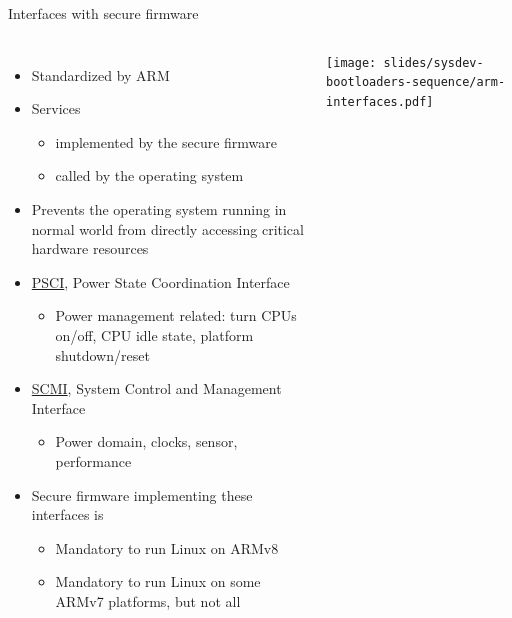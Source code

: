 \begin{frame}{Interfaces with secure firmware}
  \begin{columns}
    \begin{itemize}
    \item Standardized by ARM
    \item Services
      \begin{itemize}
      \item implemented by the secure firmware
      \item called by the operating system
      \end{itemize}
    \item Prevents the operating system running in normal world from
      directly accessing critical hardware resources
    \item
      \href{http://infocenter.arm.com/help/topic/com.arm.doc.den0022d/Power_State_Coordination_Interface_PDD_v1_1_DEN0022D.pdf}{PSCI},
      Power State Coordination Interface
      \begin{itemize}
      \item Power management related: turn CPUs on/off, CPU idle state,
        platform shutdown/reset
      \end{itemize}
    \item
      \href{http://infocenter.arm.com/help/topic/com.arm.doc.den0056a/DEN0056A_System_Control_and_Management_Interface.pdf}{SCMI},
      System Control and Management Interface
      \begin{itemize}
      \item Power domain, clocks, sensor, performance
      \end{itemize}
    \item Secure firmware implementing these interfaces is
      \begin{itemize}
      \item Mandatory to run Linux on ARMv8
      \item Mandatory to run Linux on some ARMv7 platforms, but not all
      \end{itemize}
    \end{itemize}
    \texttt{[image: slides/sysdev-bootloaders-sequence/arm-interfaces.pdf]}
  \end{columns}
\end{frame}

